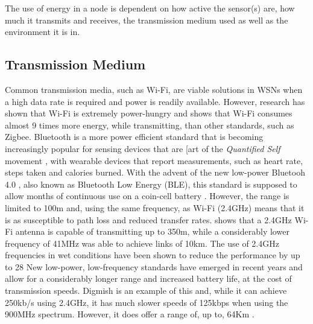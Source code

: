 	The use of energy in a node is dependent on how active the sensor(s) are, how much it transmits and receives, the transmission medium used as well as the environment it is in.

\subsection{Transmission Medium}\label{bg:trans}
	Common transmission media, such as Wi-Fi, are viable solutions in WSNs when a high data rate is required and power is readily available. However, research has shown that Wi-Fi is extremely power-hungry and \cite{Lee2007} shows that Wi-Fi consumes almost 9 times more energy, while transmitting, than other standards, such as Zigbee.
	Bluetooth is a more power efficient standard that is becoming increasingly popular for sensing devices that are [art of the \textit{Quantified Self} movement \cite{Swan2012}, with wearable devices that report measurements, such as heart rate, steps taken and calories burned. With the advent of the new low-power Bluetooh 4.0 , also known as Bluetooth Low Energy (BLE), this standard is supposed to allow months of continuous use on a coin-cell battery \cite{bluetooth2012bluetooth}. However, the range is limited to 100m and, using the same frequency, as Wi-Fi (2.4GHz) means that it is as susceptible to path loss and reduced transfer rates.
	\cite{Zennaro} shows that a 2.4GHz Wi-Fi antenna is capable of transmitting up to 350m, while a considerably lower frequency of 41MHz was able to achieve links of 10km. The use of 2.4GHz frequencies in wet conditions have been shown to reduce the performance by up to 28%
	New low-power, low-frequency standards have emerged in recent years and allow for a considerably longer range and increased battery life, at the cost of transmission speeds. Digmish is an example of this and, while it can achieve 250kb/s using 2.4GHz, it has much slower speeds of 125kbps when using the 900MHz spectrum. However, it does offer a range of, up to, 64Km \cite{Bayat2012}.

